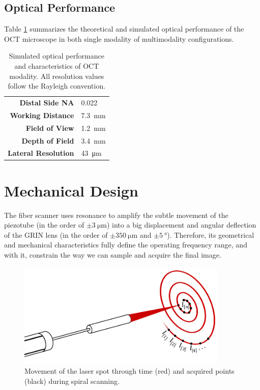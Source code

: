 \subsection*{Optical Performance}

Table \ref{tab:simRes} summarizes the theoretical and simulated optical performance of the OCT microscope in both single modality of multimodality configurations.

\begin{table}[h!]\centering
	\begin{tabular}{rl}\\
		\hline
		\textbf{Distal Side NA} & 0.022 \\ 
		\textbf{Working Distance} & \SI{7.3}{\milli\meter} \\ 
		\textbf{Field of View} & \SI{1.2}{\milli\meter} \\ 
		\textbf{Depth of Field} & \SI{3.4}{\milli\meter} \\ 
		\textbf{Lateral Resolution} & \SI{43}{\micro\meter} \\ 
		\hline
	\end{tabular} 
    \caption{Simulated optical performance and characteristics of OCT modality. All resolution values follow the Rayleigh convention.}
    \label{tab:simRes}
\end{table}





\clearpage
\section{Mechanical Design}
\label{sec:mechDesign}

The fiber scanner uses resonance to amplify the subtle movement of the piezotube (in the order of $\pm \SI{3}{\micro\meter}$) into a big displacement and angular deflection of the GRIN lens (in the order of $\pm \SI{350}{\micro\meter}$ and  $\pm \SI{5}{\degree}$). Therefore, its geometrical and mechanical characteristics fully define the operating frequency range, and with it, constrain the way we can sample and acquire the final image.

\begin{figure}[h!]\centering
      \includegraphics[width=10cm]{figures/30_DesignSimulation/Mechanical/spiralScanning.pdf}
      \caption{Movement of the laser spot through time (red) and acquired points (black) during spiral scanning.}
      \label{fig:spiralScanning}
\end{figure}

